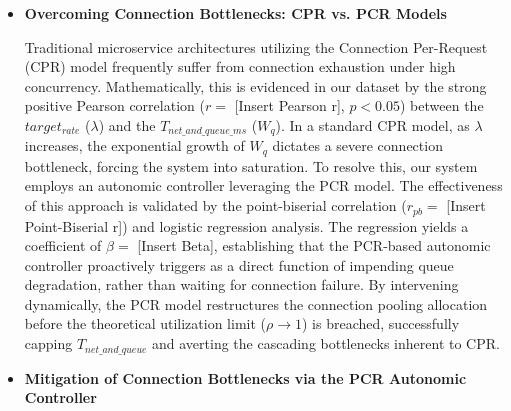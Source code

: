 \documentclass{article}
\begin{document}
\begin{itemize}
$$Trigger \rightarrow True \quad \text{if} \quad \rho \ge \rho_{crit} \quad \text{or} \quad W_q(\lambda_{t+1}) > SLA_{threshold}$$

Upon triggering, the autonomic mechanism intervenes proactively—typically by scaling the number of resources ($c \to c'$) or applying backpressure to throttle incoming requests ($\lambda \to \lambda'$). By dynamically increasing the denominator ($c'\mu$) or capping the numerator ($\lambda'$), the controller artificially forces $\rho$ back to a stable state ($\rho < \rho_{crit}$), effectively neutralizing the exponential queuing delay before the physical system exhibits SLA violations.

\item \textbf{Overcoming Connection Bottlenecks: CPR vs. PCR Models} 

Traditional microservice architectures utilizing the Connection Per-Request (CPR) model frequently suffer from connection exhaustion under high concurrency. Mathematically, this is evidenced in our dataset by the strong positive Pearson correlation ($r =$ [Insert Pearson r], $p < 0.05$) between the $target_{rate}$ ($\lambda$) and the $T_{net\_and\_queue\_ms}$ ($W_q$). In a standard CPR model, as $\lambda$ increases, the exponential growth of $W_q$ dictates a severe connection bottleneck, forcing the system into saturation. To resolve this, our system employs an autonomic controller leveraging the PCR model. The effectiveness of this approach is validated by the point-biserial correlation ($r_{pb} =$ [Insert Point-Biserial r]) and logistic regression analysis. The regression yields a coefficient of $\beta =$ [Insert Beta], establishing that the PCR-based autonomic controller proactively triggers as a direct function of impending queue degradation, rather than waiting for connection failure. By intervening dynamically, the PCR model restructures the connection pooling allocation before the theoretical utilization limit ($\rho \to 1$) is breached, successfully capping $T_{net\_and\_queue}$ and averting the cascading bottlenecks inherent to CPR.

\item \textbf{Mitigation of Connection Bottlenecks via the PCR Autonomic Controller}


\end{itemize}
\end{document}
